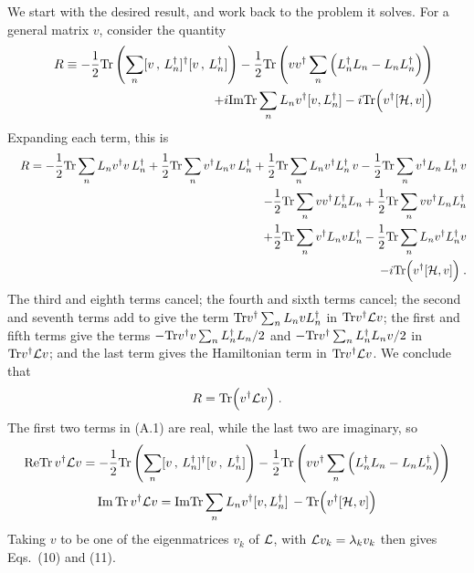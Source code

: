 We start with the desired result, and work back to the problem it solves.  For a general matrix $v$, consider the quantity 
\begin{eqnarray}
&&R\equiv-\frac{1}{2}{\rm Tr}\left(\sum_n [v\,,\,L_n^\dagger]^\dagger[v\,,\,L_n^\dagger]\right)-\frac{1}{2}{\rm Tr}\left(v v^\dagger \sum_n\Big(L_n^\dagger L_n-L_n L_n^\dagger\Big)\right)\nonumber\\
&&+i{\rm Im}{\rm Tr}\sum_n L_nv^\dagger[v,L_n^\dagger ]-i{\rm Tr}\Big(v^\dagger [{\cal H},v]\Big)
\end{eqnarray}
Expanding each term, this is
\begin{eqnarray}
&&R=-\frac{1}{2}{\rm Tr}\sum_n L_n v^\dagger v\,L_n^\dagger
+\frac{1}{2}{\rm Tr}\sum_n  v^\dagger L_n v\,L_n^\dagger
+\frac{1}{2}{\rm Tr}\sum_n L_n v^\dagger L_n^\dagger\,v
-\frac{1}{2}{\rm Tr}\sum_n v^\dagger L_n  \,L_n^\dagger\,v\nonumber\\&&
-\frac{1}{2}{\rm Tr}\sum_n v v^\dagger  L_n^\dagger L_n
+\frac{1}{2}{\rm Tr} \sum_n v v^\dagger  L_n L^\dagger_n\nonumber\\
&&+\frac{1}{2}{\rm Tr}\sum_n v^\dagger L_n v  L_n^\dagger-\frac{1}{2}{\rm Tr}\sum_n L_n v^\dagger L_n^\dagger v\nonumber\\&&
-i{\rm Tr}\Big(v^\dagger [{\cal H},v]\Big)\;.
\end{eqnarray}
The third and eighth terms cancel; the fourth and sixth terms cancel; the second and seventh terms add to give the term
${\rm Tr} v^\dagger\sum_n L_n v L_n^\dagger$ in ${\rm Tr}v^\dagger{\cal L}v$;  the first and fifth terms give the terms
$-{\rm Tr} v^\dagger v \sum_n  L_n^\dagger L_n /2$ and $-{\rm Tr} v^\dagger\sum_n L^\dagger_n  L_n v/2$ in ${\rm Tr}v^\dagger{\cal L}v$; and the last term gives the Hamiltonian term in ${\rm Tr}v^\dagger{\cal L}v$.  We conclude that 
\begin{equation}
R={\rm Tr}\Big(v^\dagger{\cal L}v\Big)\;.
\end{equation}
The first two terms in (A.1) are real, while the last two are imaginary, so
\begin{equation}
{\rm Re}{\rm Tr}\,v^\dagger{\cal L}v=-\frac{1}{2}{\rm Tr}\left(\sum_n [v\,,\,L_n^\dagger]^\dagger[v\,,\,L_n^\dagger]\right)-\frac{1}{2}{\rm Tr}\left(v v^\dagger \sum_n\Big(L_n^\dagger L_n-L_n L_n^\dagger\Big)\right)
\end{equation}
\begin{equation}
{\rm Im}\,{\rm Tr}\,v^\dagger{\cal L}v={\rm Im}{\rm Tr}\sum_n L_nv^\dagger[v,L_n^\dagger ]\,-{\rm Tr}\Big(v^\dagger [{\cal H},v]\Big)
\end{equation}
Taking $v$ to be one of the eigenmatrices $v_k$ of ${\cal L}$, with ${\cal L}v_k=\lambda_kv_k$ then gives Eqs.~(10) and (11).

